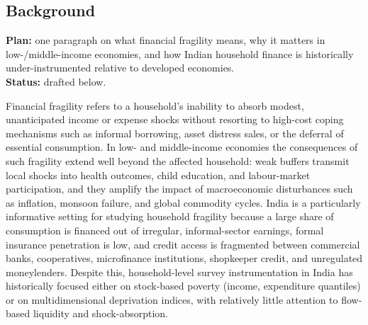 \documentclass[colorlinks,balance]{asmeconf}
\begin{document}
\subsection{Background}
\begin{outline}
\textbf{Plan:} one paragraph on what financial fragility means, why it matters in low-/middle-income economies, and how Indian household finance is historically under-instrumented relative to developed economies.\\
\textbf{Status:} drafted below.
\end{outline}
Financial fragility refers to a household's inability to absorb modest, unanticipated income or expense shocks without resorting to high-cost coping mechanisms such as informal borrowing, asset distress sales, or the deferral of essential consumption. In low- and middle-income economies the consequences of such fragility extend well beyond the affected household: weak buffers transmit local shocks into health outcomes, child education, and labour-market participation, and they amplify the impact of macroeconomic disturbances such as inflation, monsoon failure, and global commodity cycles. India is a particularly informative setting for studying household fragility because a large share of consumption is financed out of irregular, informal-sector earnings, formal insurance penetration is low, and credit access is fragmented between commercial banks, cooperatives, microfinance institutions, shopkeeper credit, and unregulated moneylenders. Despite this, household-level survey instrumentation in India has historically focused either on stock-based poverty (income, expenditure quantiles) or on multidimensional deprivation indices, with relatively little attention to flow-based liquidity and shock-absorption.
\end{document}
